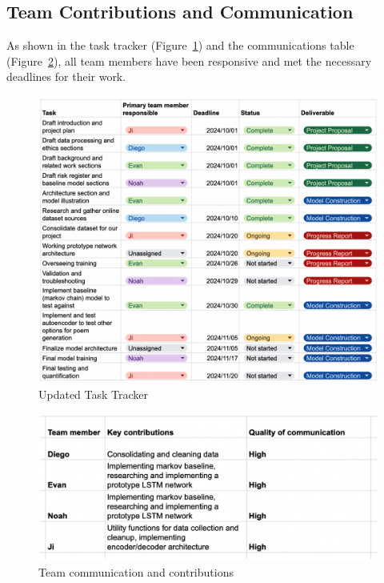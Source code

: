 \documentclass{article} %
\begin{document}
\subsection{Team Contributions and Communication}

As shown in the task tracker (Figure~\ref{fig:tasktracker}) and the communications table (Figure~\ref{fig:commstable}), all team members have been responsive and met the necessary deadlines for their work. 

\begin{figure}[h]
  \begin{center}
  \includegraphics[width=1\textwidth]{Figs/tasktracker.png}
  \end{center}
  \caption{Updated Task Tracker}
  \label{fig:tasktracker}
\end{figure}

\begin{figure}[h]
  \begin{center}
  \includegraphics[width=1\textwidth]{Figs/commstable.png}
  \end{center}
  \caption{Team communication and contributions}
  \label{fig:commstable}
\end{figure}
\end{document}
